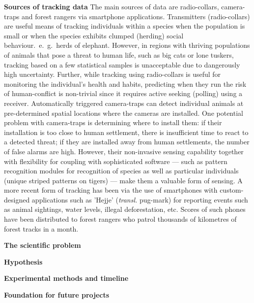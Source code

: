 \documentclass[a4paper,10pt,twocolumn]{article}
\newcommand{\hdg}[1] {\noindent \textbf{#1} }
\begin{document}
\hdg{Sources of tracking data}
The main sources of data are radio-collars, camera-traps and forest rangers via smartphone applications. 
Transmitters (radio-collars) are useful means of tracking individuals within a species when the population is small or when the species exhibits clumped (herding) social behaviour.~e.~g.~herds of elephant. However, in regions with thriving populations of animals that pose a threat to human life, such as big cats or lone tuskers, tracking based on a few statistical samples is unacceptable due to dangerously high uncertainty. Further, while tracking using radio-collars is useful for monitoring the individual's health and habits, predicting when they run the risk of human-conflict is non-trivial since it requires active seeking (polling) using a receiver. 
% 
Automatically triggered camera-traps can detect individual animals at pre-determined spatial locations where the cameras are installed. One potential problem with camera-traps is determining where to install them: if their installation is too close to human settlement, there is insufficient time to react to a detected threat; if they are installed away from human settlements, the number of false alarms are high. However, their non-invasive sensing capability together with flexibility for coupling with sophisticated software --- such as pattern recognition modules for recognition of species as well as particular individuals (unique striped patterns on tigers) --- make them a valuable form of sensing.
% 
A more recent form of tracking has been via the use of smartphones with custom-designed applications such as 'Hejje' (\textit{transl.} pug-mark) for reporting events such as animal sightings, water levels, illegal deforestation, etc. Scores of such phones have been distributed to forest rangers who patrol thousands of kilometres of forest tracks in a month. 


\hdg{The scientific problem}

\hdg{Hypothesis}

\hdg{Experimental methods and timeline}

\hdg{Foundation for future projects}

% 
% 
% 
% 
% 
% 
% 
% 



\vspace{-1em}
% 
{ \footnotesize }

\end{document}
